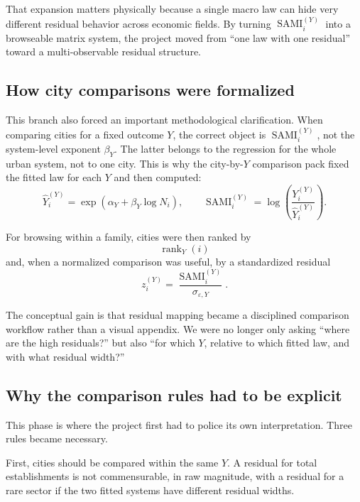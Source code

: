 \documentclass[11pt]{article}
\newcommand{\SAMI}{\operatorname{SAMI}}
\begin{document}
That expansion matters physically because a single macro law can hide very different residual behavior across economic fields. By turning \(\SAMI_i^{(Y)}\) into a browseable matrix system, the project moved from ``one law with one residual'' toward a multi-observable residual structure.

\subsection{How city comparisons were formalized}

This branch also forced an important methodological clarification. When comparing cities for a fixed outcome \(Y\), the correct object is \(\SAMI_i^{(Y)}\), not the system-level exponent \(\beta_Y\). The latter belongs to the regression for the whole urban system, not to one city. This is why the city-by-\(Y\) comparison pack fixed the fitted law for each \(Y\) and then computed:
\begin{equation}
\widehat{Y}_i^{(Y)} = \exp\!\left(\alpha_Y+\beta_Y\log N_i\right),
\qquad
\SAMI_i^{(Y)} = \log\!\left(\frac{Y_i^{(Y)}}{\widehat{Y}_i^{(Y)}}\right).
\end{equation}

For browsing within a family, cities were then ranked by
\begin{equation}
\operatorname{rank}_Y(i)
\end{equation}
and, when a normalized comparison was useful, by a standardized residual
\begin{equation}
z_i^{(Y)} = \frac{\SAMI_i^{(Y)}}{\sigma_{\varepsilon,Y}}.
\end{equation}

The conceptual gain is that residual mapping became a disciplined comparison workflow rather than a visual appendix. We were no longer only asking ``where are the high residuals?'' but also ``for which \(Y\), relative to which fitted law, and with what residual width?''

\subsection{Why the comparison rules had to be explicit}

This phase is where the project first had to police its own interpretation. Three rules became necessary.

First, cities should be compared within the same \(Y\). A residual for total establishments is not commensurable, in raw magnitude, with a residual for a rare sector if the two fitted systems have different residual widths.
\end{document}
